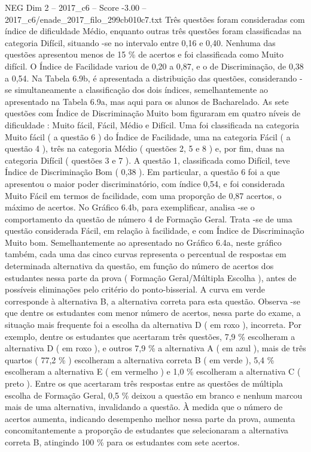 \begin{textsample}{NEG Dim 2 – 2017\_c6 – Score -3.00 – 2017\_c6/enade\_2017\_filo\_299cb010c7.txt}
Três questões foram consideradas com índice de dificuldade Médio, enquanto outras três questões foram classificadas na categoria Difícil, situando -se no intervalo entre 0,16 e 0,40.
Nenhuma das questões apresentou menos de 15 \% de acertos e foi classificada como Muito difícil.
O Índice de Facilidade variou de 0,20 a 0,87, e o de Discriminação, de 0,38 a 0,54.
Na Tabela 6.9b, é apresentada a distribuição das questões, considerando -se simultaneamente a classificação dos dois índices, semelhantemente ao apresentado na Tabela 6.9a, mas aqui para os alunos de Bacharelado.
As sete questões com Índice de Discriminação Muito bom figuraram em quatro níveis de dificuldade : Muito fácil, Fácil, Médio e Difícil.
Uma foi classificada na categoria Muito fácil ( a questão 6 ) do Índice de Facilidade, uma na categoria Fácil ( a questão 4 ), três na categoria Médio ( questões 2, 5 e 8 ) e, por fim, duas na categoria Difícil ( questões 3 e 7 ).
A questão 1, classificada como Difícil, teve Índice de Discriminação Bom ( 0,38 ).
Em particular, a questão 6 foi a que apresentou o maior poder discriminatório, com índice 0,54, e foi considerada Muito Fácil em termos de facilidade, com uma proporção de 0,87 acertos, o máximo de acertos.
No Gráfico 6.4b, para exemplificar, analisa -se o comportamento da questão de número 4 de Formação Geral.
Trata -se de uma questão considerada Fácil, em relação à facilidade, e com Índice de Discriminação Muito bom.
Semelhantemente ao apresentado no Gráfico 6.4a, neste gráfico também, cada uma das cinco curvas representa o percentual de respostas em determinada alternativa da questão, em função do número de acertos dos estudantes nessa parte da prova ( Formação Geral/Múltipla Escolha ), antes de possíveis eliminações pelo critério do ponto-bisserial.
A curva em verde corresponde à alternativa B, a alternativa correta para esta questão.
Observa -se que dentre os estudantes com menor número de acertos, nessa parte do exame, a situação mais frequente foi a escolha da alternativa D ( em roxo ), incorreta.
Por exemplo, dentre os estudantes que acertaram três questões, 7,9 \% escolheram a alternativa D ( em roxo ), e outros 7,9 \% a alternativa A ( em azul ), mais de três quartos ( 77,2 \% ) escolheram a alternativa correta B ( em verde ), 5,4 \% escolheram a alternativa E ( em vermelho ) e 1,0 \% escolheram a alternativa C ( preto ).
Entre os que acertaram três respostas entre as questões de múltipla escolha de Formação Geral, 0,5 \% deixou a questão em branco e nenhum marcou mais de uma alternativa, invalidando a questão.
À medida que o número de acertos aumenta, indicando desempenho melhor nessa parte da prova, aumenta concomitantemente a proporção de estudantes que selecionaram a alternativa correta B, atingindo 100 \% para os estudantes com sete acertos.

\end{textsample}
